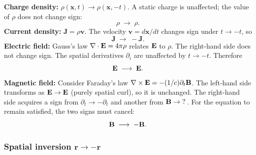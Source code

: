 \textbf{Charge density:} $\rho(\mathbf{x},t)\to\rho(\mathbf{x},-t)$.  A static charge is unaffected;
the value of $\rho$ does not change sign:
\begin{equation}\label{eq:lec10:T-rho}
  \rho \;\longrightarrow\; \rho .
\end{equation}
\textbf{Current density:} $\mathbf{J}=\rho\mathbf{v}$.  The velocity $\mathbf{v}=d\mathbf{x}/dt$
changes sign under $t\to-t$, so
\begin{equation}\label{eq:lec10:T-J}
  \mathbf{J} \;\longrightarrow\; -\mathbf{J} .
\end{equation}
\textbf{Electric field:} Gauss's law $\nabla\cdot\mathbf{E}=4\pi\rho$ relates $\mathbf{E}$ to $\rho$.  The right-hand
side does not change sign.  The spatial derivatives $\partial_i$ are unaffected by $t\to-t$.  Therefore
\begin{equation}\label{eq:lec10:T-E}
  \mathbf{E} \;\longrightarrow\; \mathbf{E} .
\end{equation}
\textbf{Magnetic field:} Consider Faraday's law $\nabla\times\mathbf{E}=-(1/c)\partial_t\mathbf{B}$.  The left-hand
side transforms as $\mathbf{E}\to\mathbf{E}$ (purely spatial curl), so it is unchanged.  The right-hand side
acquires a sign from $\partial_t\to-\partial_t$ and another from $\mathbf{B}\to\;?$\,.  For the equation
to remain satisfied, the two signs must cancel:
\begin{equation}\label{eq:lec10:T-B}
  \mathbf{B} \;\longrightarrow\; -\mathbf{B} .
\end{equation}

\begin{center}
\end{center}

\subsubsection*{Spatial inversion $\mathbf{r}\to-\mathbf{r}$}

